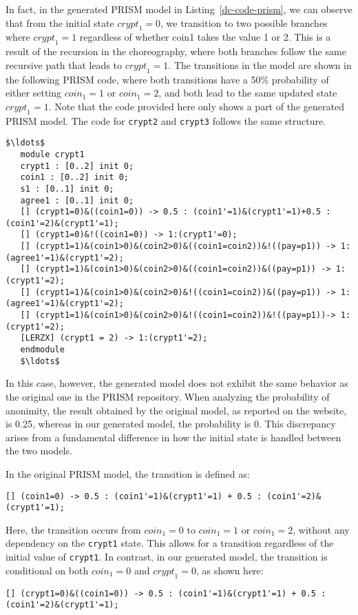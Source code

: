 In fact, in the generated PRISM model in Listing~\ref{dc-code-prism}, we can observe that from the initial state $\textit{crypt}_1 = 0$, we transition to two possible branches where $\textit{crypt}_1 = 1$ regardless of whether coin1 takes the value 1 or 2. This is a result of the recursion in the choreography, where both branches follow the same recursive path that leads to $\textit{crypt}_1 = 1$. The transitions in the model are shown in the following PRISM code, where both transitions have a 50$\%$ probability of either setting $\textit{coin}_1 = 1$ or $\textit{coin}_1 = 2$, and both lead to the same updated state $\textit{crypt}_1 = 1$. Note that the code provided here only shows a part of the generated PRISM model. The code for \texttt{crypt2} and \texttt{crypt3} follows the same structure.

\begin{lstlisting}[style=prism-color,caption={Generated PRISM program},captionpos=b,label={dc-code-prism}]
   $\ldots$
   module crypt1
   crypt1 : [0..2] init 0;
   coin1 : [0..2] init 0;
   s1 : [0..1] init 0;
   agree1 : [0..1] init 0;
   [] (crypt1=0)&((coin1=0)) -> 0.5 : (coin1'=1)&(crypt1'=1)+0.5 : (coin1'=2)&(crypt1'=1);
   [] (crypt1=0)&!((coin1=0)) -> 1:(crypt1'=0);
   [] (crypt1=1)&(coin1>0)&(coin2>0)&((coin1=coin2))&!((pay=p1)) -> 1:(agree1'=1)&(crypt1'=2);
   [] (crypt1=1)&(coin1>0)&(coin2>0)&((coin1=coin2))&((pay=p1)) -> 1:(crypt1'=2);
   [] (crypt1=1)&(coin1>0)&(coin2>0)&!((coin1=coin2))&((pay=p1)) -> 1:(agree1'=1)&(crypt1'=2);
   [] (crypt1=1)&(coin1>0)&(coin2>0)&!((coin1=coin2))&!((pay=p1))-> 1:(crypt1'=2);
   [LERZX] (crypt1 = 2) -> 1:(crypt1'=2);
   endmodule
   $\ldots$
\end{lstlisting}

In this case, however, the generated model does not exhibit the same behavior as the original one in the PRISM repository. When analyzing the probability of anonimity, the result obtained by the original model, as reported on the website, is 0.25, whereas in our generated model, the probability is 0. This discrepancy arises from a fundamental difference in how the initial state is handled between the two models.

In the original PRISM model, the transition is defined as:
\begin{lstlisting}[style=prism-color, frame=none, numbers=none]
   [] (coin1=0) -> 0.5 : (coin1'=1)&(crypt1'=1) + 0.5 : (coin1'=2)&(crypt1'=1);
   \end{lstlisting}
Here, the transition occurs from $\textit{coin}_1 = 0$ to $\textit{coin}_1 = 1$ or $\textit{coin}_1 = 2$, without any dependency on the \texttt{crypt1} state. This allows for a transition regardless of the initial value of \texttt{crypt1}.
In contrast, in our generated model, the transition is conditional on both $\textit{coin}_1 = 0$ and $\textit{crypt}_1 = 0$, as shown here:
\begin{lstlisting}[style=prism-color, frame=none, numbers=none]
   [] (crypt1=0)&((coin1=0)) -> 0.5 : (coin1'=1)&(crypt1'=1) + 0.5 : (coin1'=2)&(crypt1'=1);
   \end{lstlisting}


